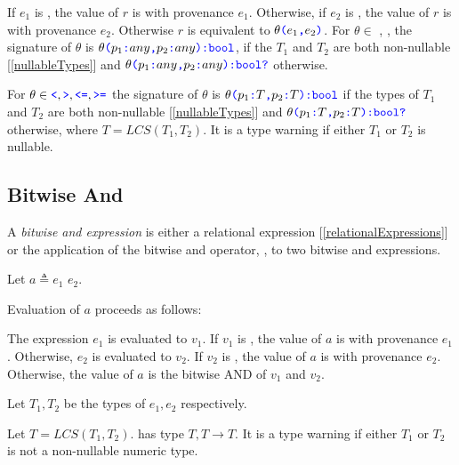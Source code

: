 \documentclass{article}
\begin{document}
{If $e_1$ is \NULL{}, the value of $r$ is \NULL{} with provenance $e_1$. 
Otherwise, if $e_2$ is \NULL{}, the value of $r$ is \NULL{} with provenance $e_2$. 
Otherwise $r$ is equivalent to $\theta\texttt{\color{blue} (}{}e_1\texttt{\color{blue} ,}{} e_2\texttt{\color{blue} )}$. For $\theta{} \in$ \EQ{}, \NEQ{},  the signature of $\theta$ is $\theta\texttt{\color{blue} (}{}p_1\texttt{\color{blue} :}{} any \texttt{\color{blue} ,}{} p_2\texttt{\color{blue} :}{} any \texttt{\color{blue} )}\texttt{\color{blue} :}{}\texttt{\color{blue} bool}$, if the  $T_1$ and $T_2$ are both non-nullable [\ref{nullableTypes}] and $\theta\texttt{\color{blue} (}{}p_1\texttt{\color{blue} :}{} any \texttt{\color{blue} ,}{} p_2\texttt{\color{blue} :}{} any \texttt{\color{blue} )}\texttt{\color{blue} :}{}\texttt{\color{blue} bool}\texttt{\color{blue} ?}$ otherwise.

For $\theta{} \in  \texttt{\color{blue} \tt<}{}, \texttt{\color{blue} \tt>}{}, \texttt{\color{blue} \tt<=}{}, \texttt{\color{blue} \tt>=}{}$ the signature of $\theta$ is $\theta\texttt{\color{blue} (}{}p_1\texttt{\color{blue} :}{} T\texttt{\color{blue} ,}{} p_2\texttt{\color{blue} :}{} T\texttt{\color{blue} )}\texttt{\color{blue} :}{}\texttt{\color{blue} bool}$ if the  types of $T_1$ and $T_2$ are both non-nullable [\ref{nullableTypes}] and $\theta\texttt{\color{blue} (}{}p_1\texttt{\color{blue} :}{} T\texttt{\color{blue} ,}{} p_2\texttt{\color{blue} :}{} T\texttt{\color{blue} )}\texttt{\color{blue} :}{}\texttt{\color{blue} bool}\texttt{\color{blue} ?}$ otherwise, where $T = LCS(T_1, T_2)$. It is a type warning if either $T_1$ or $T_2$ is nullable. 


\subsection{\space Bitwise And}
\label{bitwiseAnd}

A {\em bitwise and expression} is either a relational expression [\ref{relationalExpressions}] or the application of the bitwise and operator, \BAND{}, to two bitwise and expressions.

Let $a \triangleq e_1$ \BAND{} $e_2$.

Evaluation of $a$ proceeds as follows:

The expression $e_1$ is evaluated to $v_1$.  If  $v_1$ is \NULL{}, the value of $a$ is \NULL{} with provenance $e_1$. Otherwise, $e_2$ is evaluated to $v_2$. If  $v_2$ is \NULL{}, the value of $a$ is \NULL{} with provenance $e_2$. Otherwise, the value of $a$ is the bitwise AND of $v_1$ and $v_2$.

Let $T_1, T_2$ be the types of $e_1, e_2$ respectively.  

Let $T = LCS(T_1, T_2)$. \BAND{} has type $T,T  \to T$. 
It is a type warning if either $T_1$ or $T_2$ is not a non-nullable numeric type.



}
\end{document}
